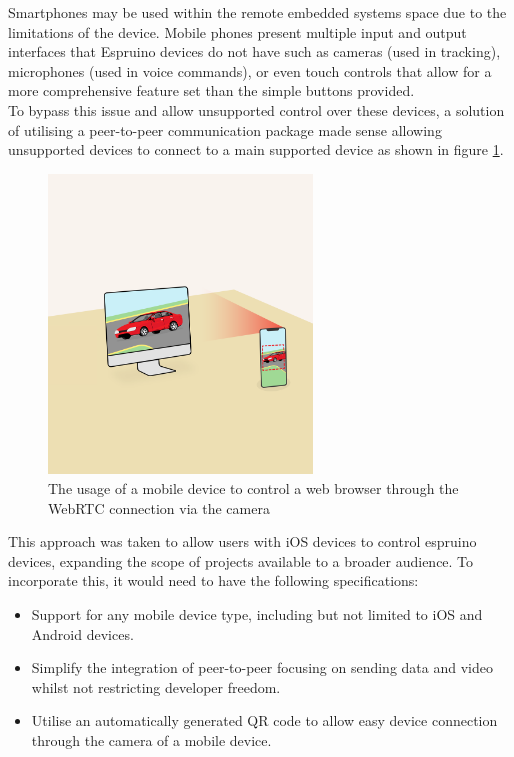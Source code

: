 \documentclass{l4proj}
\begin{document}
Smartphones may be used within the remote embedded systems space due to the limitations of the device. Mobile phones present multiple input and output interfaces that Espruino devices do not have such as cameras (used in tracking), microphones (used in voice commands), or even touch controls that allow for a more comprehensive feature set than the simple buttons provided.
\\ 

To bypass this issue and allow unsupported control over these devices, a solution of utilising a peer-to-peer communication package made sense allowing unsupported devices to connect to a main supported device as shown in figure \ref{fig:mobile-computer-connection}. 

\begin{figure}[!ht]
    \centering
    \includegraphics[width=7cm]{dissertation/images/mobile-computer-connection.png}
    \caption{The usage of a mobile device to control a web browser through the WebRTC connection via the camera}
    \label{fig:mobile-computer-connection}
\end{figure}

This approach was taken to allow users with iOS devices to control espruino devices, expanding the scope of projects available to a broader audience. To incorporate this, it would need to have the following specifications:
\\
\begin{itemize}
    \item Support for any mobile device type, including but not limited to iOS and Android devices.
    \item Simplify the integration of peer-to-peer focusing on sending data and video whilst not restricting developer freedom.
    \item Utilise an automatically generated QR code to allow easy device connection through the camera of a mobile device.
\end{itemize}
\end{document}
